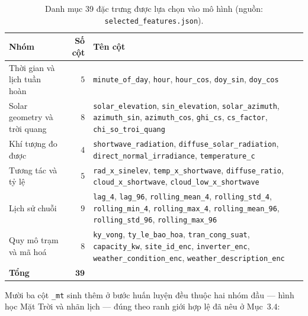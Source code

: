 \begin{table}[htbp]
\centering
\caption{Danh mục 39 đặc trưng được lựa chọn vào mô hình (nguồn: \texttt{selected\_features.json}).}
\label{tab:bo_dac_trung}
\small
\begin{tabular}{@{}L{4.0cm} r L{9.0cm}@{}}
\toprule
\textbf{Nhóm} & \textbf{Số cột} & \textbf{Tên cột} \\
\midrule
Thời gian và lịch tuần hoàn & $5$ &
\texttt{minute\_of\_day}, \texttt{hour}, \texttt{hour\_cos},
\texttt{doy\_sin}, \texttt{doy\_cos} \\
\addlinespace
Solar geometry và trời quang & $8$ &
\texttt{solar\_elevation}, \texttt{sin\_elevation}, \texttt{solar\_azimuth},
\texttt{azimuth\_sin}, \texttt{azimuth\_cos}, \texttt{ghi\_cs}, \texttt{cs\_factor},
\texttt{chi\_so\_troi\_quang} \\
\addlinespace
Khí tượng đo được & $4$ &
\texttt{shortwave\_radiation}, \texttt{diffuse\_solar\_radiation},
\texttt{direct\_normal\_irradiance}, \texttt{temperature\_c} \\
\addlinespace
Tương tác và tỷ lệ & $5$ &
\texttt{rad\_x\_sinelev}, \texttt{temp\_x\_shortwave}, \texttt{diffuse\_ratio},
\texttt{cloud\_x\_shortwave}, \texttt{cloud\_low\_x\_shortwave} \\
\addlinespace
Lịch sử chuỗi & $9$ &
\texttt{lag\_4}, \texttt{lag\_96}, \texttt{rolling\_mean\_4}, \texttt{rolling\_std\_4},
\texttt{rolling\_min\_4}, \texttt{rolling\_max\_4}, \texttt{rolling\_mean\_96},
\texttt{rolling\_std\_96}, \texttt{rolling\_max\_96} \\
\addlinespace
Quy mô trạm và mã hoá & $8$ &
\texttt{ky\_vong}, \texttt{ty\_le\_bao\_hoa}, \texttt{tran\_cong\_suat}, \texttt{capacity\_kw},
\texttt{site\_id\_enc}, \texttt{inverter\_enc},
\texttt{weather\_condition\_enc}, \texttt{weather\_description\_enc} \\
\midrule
\textbf{Tổng} & $\mathbf{39}$ & \\
\bottomrule
\end{tabular}
\end{table}

\enlargethispage{3\baselineskip}
Mười ba cột \texttt{\_mt} sinh thêm ở bước huấn luyện đều thuộc hai nhóm đầu --- hình học Mặt Trời
và nhãn lịch --- đúng theo ranh giới hợp lệ đã nêu ở Mục~$3.4$:

